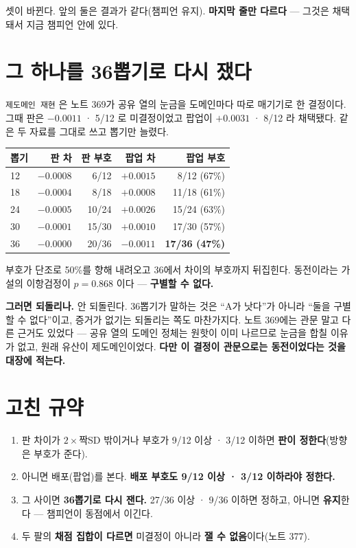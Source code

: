 \documentclass[11pt]{article}
\begin{document}
셋이 바뀐다. 앞의 둘은 결과가 같다(챔피언 유지). \textbf{마지막 줄만
다르다} --- 그것은 채택돼서 지금 챔피언 안에 있다.

\section{그 하나를 36뽑기로 다시 쟀다}

\texttt{제도메인 재현} 은 노트 369가 공유 열의 눈금을 도메인마다 따로
매기기로 한 결정이다. 그때 판은 $-0.0011$ · 5/12 로 미결정이었고 팝업이
$+0.0031$ · 8/12 라 채택됐다. 같은 두 자료를 그대로 쓰고 뽑기만 늘렸다.

\begin{center}
\begin{tabular}{lrrrr}
\hline
뽑기 & 판 차 & 판 부호 & 팝업 차 & 팝업 부호 \\
\hline
12 & $-0.0008$ & 6/12 & $+0.0015$ & 8/12 (67\%) \\
18 & $-0.0004$ & 8/18 & $+0.0008$ & 11/18 (61\%) \\
24 & $-0.0005$ & 10/24 & $+0.0026$ & 15/24 (63\%) \\
30 & $-0.0001$ & 15/30 & $+0.0010$ & 17/30 (57\%) \\
36 & $-0.0000$ & 20/36 & $\mathbf{-0.0011}$ & \textbf{17/36 (47\%)} \\
\hline
\end{tabular}
\end{center}

부호가 단조로 50\%를 향해 내려오고 36에서 차이의 부호까지 뒤집힌다.
동전이라는 가설의 이항검정이 $p=0.868$ 이다 --- \textbf{구별할 수 없다.}

\textbf{그러면 되돌리나.} 안 되돌린다. 36뽑기가 말하는 것은 ``A가 낫다''가
아니라 ``둘을 구별할 수 없다''이고, 증거가 없기는 되돌리는 쪽도 마찬가지다.
노트 369에는 관문 말고 다른 근거도 있었다 --- 공유 열의 도메인 정체는
원핫이 이미 나르므로 눈금을 합칠 이유가 없고, 원래 유산이 제도메인이었다.
\textbf{다만 이 결정이 관문으로는 동전이었다는 것을 대장에 적는다.}

\section{고친 규약}

\begin{enumerate}
\item 판 차이가 $2\times$짝SD 밖이거나 부호가 9/12 이상 · 3/12 이하면
\textbf{판이 정한다}(방향은 부호가 준다).
\item 아니면 배포(팝업)를 본다. \textbf{배포 부호도 9/12 이상 · 3/12
이하라야 정한다.}
\item 그 사이면 \textbf{36뽑기로 다시 잰다.} 27/36 이상 · 9/36 이하면
정하고, 아니면 \textbf{유지}한다 --- 챔피언이 동점에서 이긴다.
\item 두 팔의 \textbf{채점 집합이 다르면} 미결정이 아니라 \textbf{잴 수
없음}이다(노트 377).
\end{enumerate}
\end{document}

